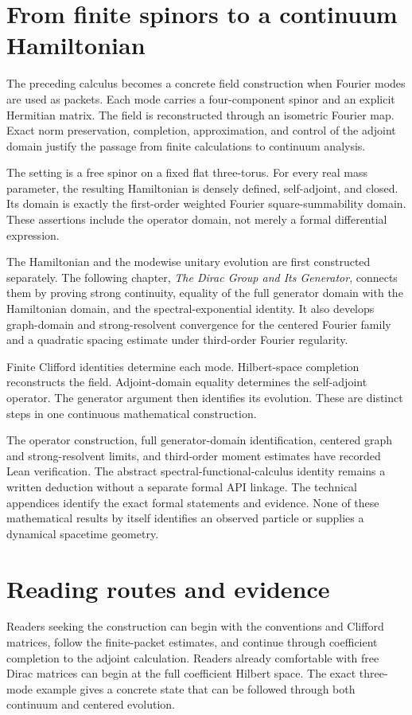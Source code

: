 \section*{From finite spinors to a continuum Hamiltonian}
The preceding calculus becomes a concrete field construction when Fourier modes are used as packets. Each mode carries a four-component spinor and an explicit Hermitian matrix. The field is reconstructed through an isometric Fourier map. Exact norm preservation, completion, approximation, and control of the adjoint domain justify the passage from finite calculations to continuum analysis.

The setting is a free spinor on a fixed flat three-torus. For every real mass parameter, the resulting Hamiltonian is densely defined, self-adjoint, and closed. Its domain is exactly the first-order weighted Fourier square-summability domain. These assertions include the operator domain, not merely a formal differential expression.

The Hamiltonian and the modewise unitary evolution are first constructed separately. The following chapter, \emph{The Dirac Group and Its Generator}, connects them by proving strong continuity, equality of the full generator domain with the Hamiltonian domain, and the spectral-exponential identity. It also develops graph-domain and strong-resolvent convergence for the centered Fourier family and a quadratic spacing estimate under third-order Fourier regularity.

\begin{readerroadmap}[title={The role of this construction}]
Finite Clifford identities determine each mode. Hilbert-space completion reconstructs the field. Adjoint-domain equality determines the self-adjoint operator. The generator argument then identifies its evolution. These are distinct steps in one continuous mathematical construction.
\end{readerroadmap}

The operator construction, full generator-domain identification, centered graph and strong-resolvent limits, and third-order moment estimates have recorded Lean verification. The abstract spectral-functional-calculus identity remains a written deduction without a separate formal API linkage. The technical appendices identify the exact formal statements and evidence. None of these mathematical results by itself identifies an observed particle or supplies a dynamical spacetime geometry.

\clearpage
\section*{Reading routes and evidence}
Readers seeking the construction can begin with the conventions and Clifford matrices, follow the finite-packet estimates, and continue through coefficient completion to the adjoint calculation. Readers already comfortable with free Dirac matrices can begin at the full coefficient Hilbert space. The exact three-mode example gives a concrete state that can be followed through both continuum and centered evolution.

